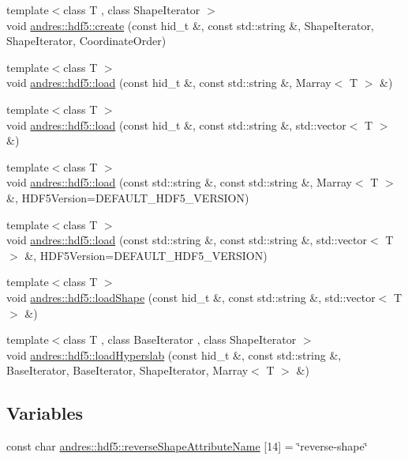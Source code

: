 \begin{DoxyCompactItemize}
\item 
{\footnotesize template$<$class T , class Shape\+Iterator $>$ }\\void \hyperlink{namespaceandres_1_1hdf5_ad266faeb7371428b1bf018d4ddfec60d}{andres\+::hdf5\+::create} (const hid\+\_\+t \&, const std\+::string \&, Shape\+Iterator, Shape\+Iterator, Coordinate\+Order)
\item 
{\footnotesize template$<$class T $>$ }\\void \hyperlink{namespaceandres_1_1hdf5_ad5975e294df6102c312f69cd69e43d60}{andres\+::hdf5\+::load} (const hid\+\_\+t \&, const std\+::string \&, Marray$<$ T $>$ \&)
\item 
{\footnotesize template$<$class T $>$ }\\void \hyperlink{namespaceandres_1_1hdf5_a2ada1d6f4dc33d14090bad2a90d4d1a6}{andres\+::hdf5\+::load} (const hid\+\_\+t \&, const std\+::string \&, std\+::vector$<$ T $>$ \&)
\item 
{\footnotesize template$<$class T $>$ }\\void \hyperlink{namespaceandres_1_1hdf5_aecef33e8f815adf3e28bb387e246ebc8}{andres\+::hdf5\+::load} (const std\+::string \&, const std\+::string \&, Marray$<$ T $>$ \&, H\+D\+F5\+Version=D\+E\+F\+A\+U\+L\+T\+\_\+\+H\+D\+F5\+\_\+\+V\+E\+R\+S\+I\+ON)
\item 
{\footnotesize template$<$class T $>$ }\\void \hyperlink{namespaceandres_1_1hdf5_a1efbca2cf84e0a2076dd02b98a96b65b}{andres\+::hdf5\+::load} (const std\+::string \&, const std\+::string \&, std\+::vector$<$ T $>$ \&, H\+D\+F5\+Version=D\+E\+F\+A\+U\+L\+T\+\_\+\+H\+D\+F5\+\_\+\+V\+E\+R\+S\+I\+ON)
\item 
{\footnotesize template$<$class T $>$ }\\void \hyperlink{namespaceandres_1_1hdf5_a9ce6bf731e79264846d466fd92eee01f}{andres\+::hdf5\+::load\+Shape} (const hid\+\_\+t \&, const std\+::string \&, std\+::vector$<$ T $>$ \&)
\item 
{\footnotesize template$<$class T , class Base\+Iterator , class Shape\+Iterator $>$ }\\void \hyperlink{namespaceandres_1_1hdf5_ab031fffd5429859c7f914d8f883a6224}{andres\+::hdf5\+::load\+Hyperslab} (const hid\+\_\+t \&, const std\+::string \&, Base\+Iterator, Base\+Iterator, Shape\+Iterator, Marray$<$ T $>$ \&)
\end{DoxyCompactItemize}
\subsection*{Variables}
\begin{DoxyCompactItemize}
\item 
const char \hyperlink{namespaceandres_1_1hdf5_acf79cfe1ea0769086a46970fd58188a7}{andres\+::hdf5\+::reverse\+Shape\+Attribute\+Name} \mbox{[}14\mbox{]} = \char`\"{}reverse-\/shape\char`\"{}
\end{DoxyCompactItemize}


